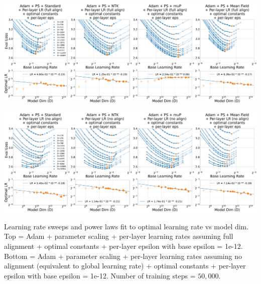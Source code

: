 \documentclass{article}
\theoremstyle{plain}
\theoremstyle{definition}
\theoremstyle{remark}
\begin{document}
\thispagestyle{plain}
\begin{SidewaysFigure}
\includegraphics[width=0.98\linewidth]{icml2024/figures/lr_sweeps/appendix/adam_ps/adam_ps+50k_steps_per_module_lr_optimal_constants_per_module_eps_base_eps12.pdf}

\figvspace

\includegraphics[width=0.98\linewidth]{icml2024/figures/lr_sweeps/appendix/adam_ps/adam_ps+50k_steps_per_module_lr_no_align_optimal_constants_per_module_eps_base_eps12.pdf}
\caption{Learning rate sweeps and power laws fit to optimal learning rate vs model dim. Top = Adam + parameter scaling + per-layer learning rates assuming full alignment + optimal constants + per-layer epsilon with base epsilon = 1e-12. Bottom = Adam + parameter scaling + per-layer learning rates assuming no alignment (equivalent to global learning rate) + optimal constants + per-layer epsilon with base epsilon = 1e-12. Number of training steps = $50{,}000$.}
\end{SidewaysFigure}
\clearpage
\end{document}
